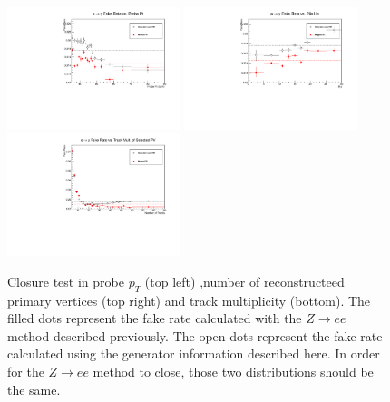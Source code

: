 \begin{figure}[H]
\begin{center}
{\includegraphics[width=0.45\textwidth]{efake_figs/closure_old_pt.pdf}}
{\includegraphics[width=0.45\textwidth]{efake_figs/closure_old_pu.pdf}}
\\
{\includegraphics[width=0.45\textwidth]{efake_figs/closure_old_trk.pdf}}
\caption{Closure test in probe $p_T$ (top left) ,number of reconstructeed primary vertices (top right) and track multiplicity (bottom). The filled dots represent the fake rate calculated with the $Z\rightarrow ee$ method described previously. The open dots represent the fake rate calculated using the generator information described here. In order for the $Z\rightarrow ee$ method to close, those two distributions should be the same. }
\label{closure_old}
\end{center}
\end{figure}
%

